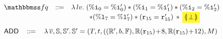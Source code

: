 \begin{figure*}[!t]
\[\begin{array}{cc}
\begin{array}{lcl}
				\relspecpost & \define & \lambda \, lv. \;
                (\ireg{0} = \ireg{0}')
                \sepstar (\ireg{1} = \ireg{1}')
                \sepstar (\ireg{2} = \ireg{2}') 
                \\
				& &
                \hspace*{6ex} 
                \sepstar (\lreg{7} = \lreg{7}')
                \sepstar (\reg{15} = \reg{15}') 
                \, \sepstar \, 
                \colorbox{yellow!80}{$\safePrimAst{\,\primdone\,}$}
            \end{array} \\
            \\[-5pt]
            \multicolumn{2}{l}
            {
                \begin{array}{lcl}
                    \primAdd & \, \define \, & 
                    \lambda \, \args{\val}, \hpstate, \hpstate'. \, 
                    \hpstate' = 
                    (\thrdpool, \thrdid, ((\hRfile', \block, \hWstk), 
                        \hRfile(\reg{15})\!+\!8, 
                        \hRfile(\reg{15})\!+\!12), \Mem)
                    \\
                    \\[-9pt]
                    \multicolumn{3}{l}
                    {
}
\end{array}}
\end{array}\]
\end{figure*}
